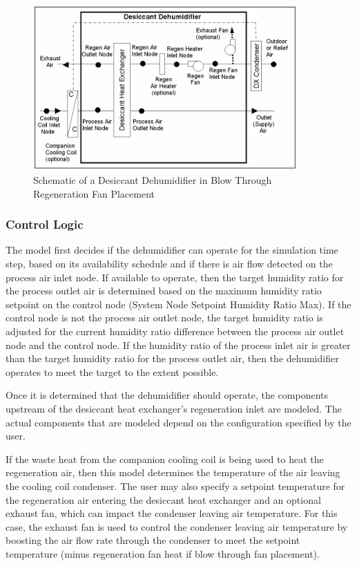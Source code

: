 \begin{figure}[hbtp] %
\centering
\includegraphics[width=0.9\textwidth, height=0.9\textheight, keepaspectratio=true]{media/image5200.png}
\caption{Schematic of a Desiccant Dehumidifier in Blow Through Regeneration Fan Placement \protect \label{fig:schematic-of-a-desiccant-dehumidifier-in-blow}}
\end{figure}

\subsubsection{Control Logic}\label{control-logic}

The model first decides if the dehumidifier can operate for the simulation time step, based on its availability schedule and if there is air flow detected on the process air inlet node. If available to operate, then the target humidity ratio for the process outlet air is determined based on the maximum humidity ratio setpoint on the control node (System Node Setpoint Humidity Ratio Max). If the control node is not the process air outlet node, the target humidity ratio is adjusted for the current humidity ratio difference between the process air outlet node and the control node. If the humidity ratio of the process inlet air is greater than the target humidity ratio for the process outlet air, then the dehumidifier operates to meet the target to the extent possible.

Once it is determined that the dehumidifier should operate, the components upstream of the desiccant heat exchanger's regeneration inlet are modeled. The actual components that are modeled depend on the configuration specified by the user.

If the waste heat from the companion cooling coil is being used to heat the regeneration air, then this model determines the temperature of the air leaving the cooling coil condenser. The user may also specify a setpoint temperature for the regeneration air entering the desiccant heat exchanger and an optional exhaust fan, which can impact the condenser leaving air temperature. For this case, the exhaust fan is used to control the condenser leaving air temperature by boosting the air flow rate through the condenser to meet the setpoint temperature (minus regeneration fan heat if blow through fan placement).

